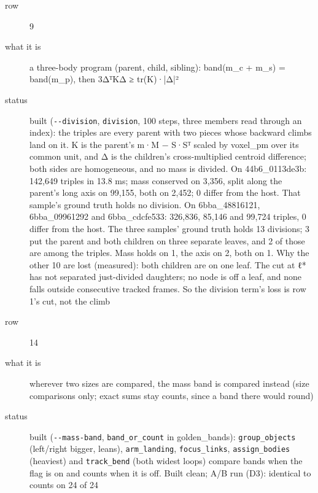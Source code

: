 \begin{description}
\item[{row}] 9
\item[{what it is}] a three-body program (parent, child, sibling): band(m\_\allowbreak{}c + m\_\allowbreak{}s) = band(m\_\allowbreak{}p), then 3ΔᵀKΔ ≥ tr(K)·|Δ|²
\item[{status}] built (\texttt{-\allowbreak{}-\allowbreak{}division}, \texttt{division}, 100 steps, three members read through an index): the triples are every parent with two pieces whose backward climbs land on it. K is the parent's m·M − S·Sᵀ scaled by voxel\_\allowbreak{}pm over its common unit, and Δ is the children's cross-multiplied centroid difference; both sides are homogeneous, and no mass is divided. On 44b6\_\allowbreak{}0113de3b: 142,649 triples in 13.8 ms; mass conserved on 3,356, split along the parent's long axis on 99,155, both on 2,452; 0 differ from the host. That sample's ground truth holds no division. On 6bba\_\allowbreak{}48816121, 6bba\_\allowbreak{}09961292 and 6bba\_\allowbreak{}cdcfe533: 326,836, 85,146 and 99,724 triples, 0 differ from the host. The three samples' ground truth holds 13 divisions; 3 put the parent and both children on three separate leaves, and 2 of those are among the triples. Mass holds on 1, the axis on 2, both on 1. Why the other 10 are lost (measured): both children are on one leaf. The cut at ℓ* has not separated just-divided daughters; no node is off a leaf, and none falls outside consecutive tracked frames. So the division term's loss is row 1's cut, not the climb
\end{description}

\begin{description}
\item[{row}] 14
\item[{what it is}] wherever two sizes are compared, the mass band is compared instead (size comparisons only; exact sums stay counts, since a band there would round)
\item[{status}] built (\texttt{-\allowbreak{}-\allowbreak{}mass-\allowbreak{}band}, \texttt{band\_\allowbreak{}or\_\allowbreak{}count} in golden\_\allowbreak{}bands): \texttt{group\_\allowbreak{}objects} (left/right bigger, leans), \texttt{arm\_\allowbreak{}landing}, \texttt{focus\_\allowbreak{}links}, \texttt{assign\_\allowbreak{}bodies} (heaviest) and \texttt{track\_\allowbreak{}bend} (both widest loops) compare bands when the flag is on and counts when it is off. Built clean; A/B run (D3): identical to counts on 24 of 24
\end{description}


